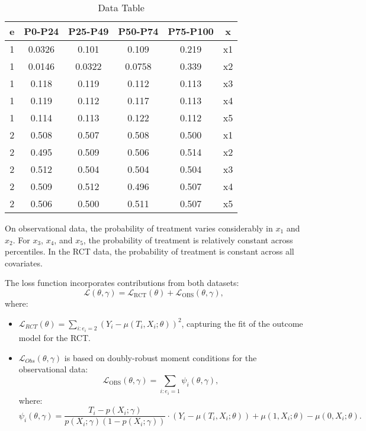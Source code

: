 \documentclass{article}
\begin{document}
\begin{table}[H]
  \centering
  \renewcommand{\arraystretch}{1.5}
  \begin{tabular}{|c|c|c|c|c|c|}
    \hline
    \textbf{e} & \textbf{P0-P24} & \textbf{P25-P49} & \textbf{P50-P74} & \textbf{P75-P100} & \textbf{x} \\
    \hline
    1 & 0.0326 & 0.101 & 0.109 & 0.219 & x1 \\ \hline
    1 & 0.0146 & 0.0322 & 0.0758 & 0.339 & x2 \\ \hline
    1 & 0.118 & 0.119 & 0.112 & 0.113 & x3 \\ \hline
    1 & 0.119 & 0.112 & 0.117 & 0.113 & x4 \\ \hline
    1 & 0.114 & 0.113 & 0.122 & 0.112 & x5 \\ \hline
    2 & 0.508 & 0.507 & 0.508 & 0.500 & x1 \\ \hline
    2 & 0.495 & 0.509 & 0.506 & 0.514 & x2 \\ \hline
    2 & 0.512 & 0.504 & 0.504 & 0.504 & x3 \\ \hline
    2 & 0.509 & 0.512 & 0.496 & 0.507 & x4 \\ \hline
    2 & 0.506 & 0.500 & 0.511 & 0.507 & x5 \\ \hline
  \end{tabular}
  \caption{Data Table}
\end{table}

On observational data, the probability of treatment varies considerably in $x_1$ and $x_2$. For $x_3$, $x_4$, and $x_5$, the probability of treatment is relatively constant across percentiles. In the RCT data, the probability of treatment is constant across all covariates.

The loss function incorporates contributions from both datasets:
\[
\mathcal{L}(\theta, \gamma) = \mathcal{L}_{\text{RCT}}(\theta) + \mathcal{L}_{\text{OBS}}(\theta, \gamma),
\]
where:
\begin{itemize}
    \item \( \mathcal{L}_{RCT}(\theta) = \sum_{i: e_i=2} (Y_i - \mu(T_i, X_i; \theta))^2 \), capturing the fit of the outcome model for the RCT.
    \item \( \mathcal{L}_{Obs}(\theta, \gamma) \) is based on doubly-robust moment conditions for the observational data:
    \[
      \mathcal{L}_{\text{OBS}}(\theta, \gamma) = \sum_{i: e_i=1} \psi_i(\theta, \gamma),
    \]
    where:
    \[
    \psi_i(\theta, \gamma) = \frac{T_i - p(X_i; \gamma)}{p(X_i; \gamma)(1 - p(X_i; \gamma))} \cdot (Y_i - \mu(T_i, X_i; \theta)) + \mu(1, X_i; \theta) - \mu(0, X_i; \theta).
    \]
\end{itemize}
\end{document}
